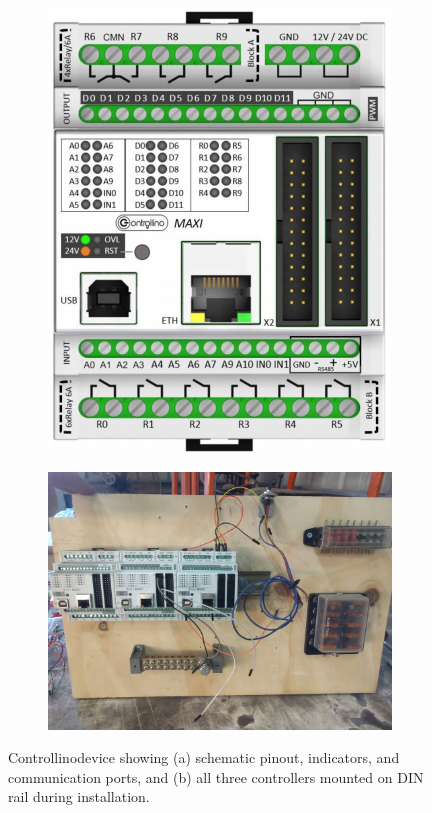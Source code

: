 \documentclass[fleqn,twoside,12pt]{report}
\begin{document}
\begin{figure}[h]
	\centering
	\begin{subfigure}{0.5\textwidth}
		\centering
		\includegraphics[width=0.95\linewidth]{controllino_1.png}
		\caption{}
		\label{fig:controllino_1}
	\end{subfigure}%
	\begin{subfigure}{0.5\textwidth}
		\centering
		\includegraphics[width=0.95\linewidth]{controllino_2.jpg}
		\caption{}
		\label{fig:controllino_2}
	\end{subfigure}%
	\caption{Controllino\texttrademark device showing (a) schematic pinout, indicators, and communication ports, and (b) all three controllers mounted on DIN rail during installation.}
	\label{}
\end{figure}
\end{document}
